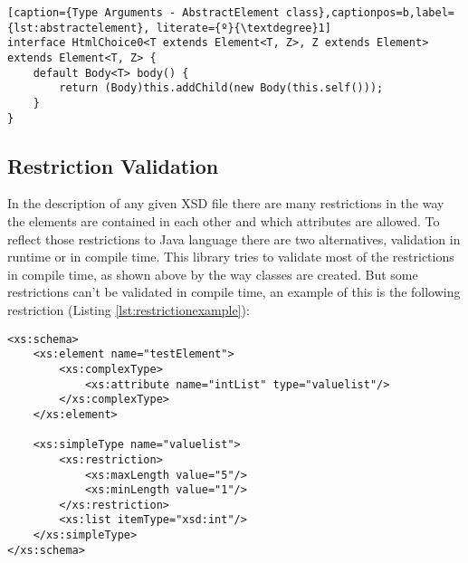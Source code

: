 \bigskip


\begin{minipage}{\linewidth}
\begin{lstlisting}[caption={Type Arguments - AbstractElement class},captionpos=b,label={lst:abstractelement}, literate={º}{\textdegree}1]
interface HtmlChoice0<T extends Element<T, Z>, Z extends Element> 		                                           extends Element<T, Z> {
    default Body<T> body() {
        return (Body)this.addChild(new Body(this.self()));
    }
}
\end{lstlisting}
\end{minipage}

\subsection{Restriction Validation}
\label{sec:restrictionvalidation}

In the description of any given \ac{XSD} file there are many restrictions in the way the elements are contained in each other and which attributes are allowed. To reflect those restrictions to Java language there are two alternatives, validation in runtime or in compile time. This library tries to validate most of the restrictions in compile time, as shown above by the way classes are created. But some restrictions can't be validated in compile time, an example of this is the following restriction (Listing \ref{lst:restrictionexample}):

\bigskip


\begin{minipage}{\linewidth}
\begin{lstlisting}[caption={Restrictions Example},captionpos=b,label={lst:restrictionexample}]
<xs:schema>
    <xs:element name="testElement">
        <xs:complexType>
            <xs:attribute name="intList" type="valuelist"/>
        </xs:complexType>
    </xs:element>
    
    <xs:simpleType name="valuelist">
        <xs:restriction>
            <xs:maxLength value="5"/>
            <xs:minLength value="1"/>
        </xs:restriction>
        <xs:list itemType="xsd:int"/>
    </xs:simpleType>
</xs:schema>
\end{lstlisting}
\end{minipage}

